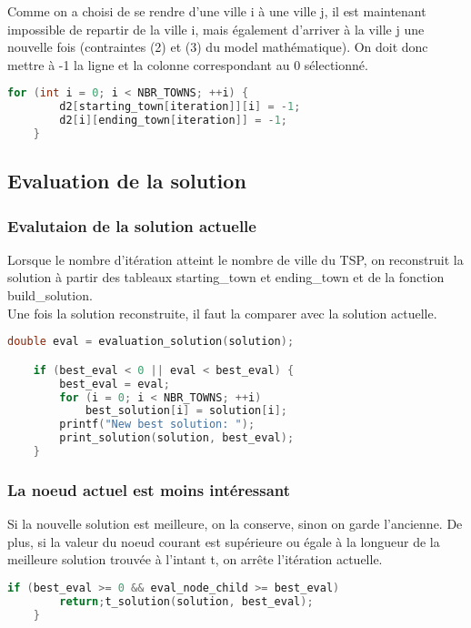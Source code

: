 \documentclass[a4paper]{article}
\begin{document}
Comme on a choisi de se rendre d'une ville i à une ville j, il est maintenant impossible de repartir de la ville i, mais également d'arriver à la ville j une nouvelle fois (contraintes (2) et (3) du model mathématique). On doit donc mettre à -1 la ligne et la colonne correspondant au 0 sélectionné.

\begin{lstlisting}[language=C]
    for (int i = 0; i < NBR_TOWNS; ++i) {
        d2[starting_town[iteration]][i] = -1;
        d2[i][ending_town[iteration]] = -1;
    }
\end{lstlisting}

\subsection{Evaluation de la solution}

\subsubsection{Evalutaion de la solution actuelle}

Lorsque le nombre d'itération atteint le nombre de ville du TSP, on reconstruit la solution à partir des tableaux starting\_town et ending\_town et de la fonction build\_solution.\\

Une fois la solution reconstruite, il faut la comparer avec la solution actuelle.

\begin{lstlisting}[language=C]
    double eval = evaluation_solution(solution);

    if (best_eval < 0 || eval < best_eval) {
        best_eval = eval;
        for (i = 0; i < NBR_TOWNS; ++i)
            best_solution[i] = solution[i];
        printf("New best solution: ");
        print_solution(solution, best_eval);
    }
\end{lstlisting}

\subsubsection{La noeud actuel est moins intéressant}

Si la nouvelle solution est meilleure, on la conserve, sinon on garde l'ancienne. De plus, si la valeur du noeud courant est supérieure ou égale à la longueur de la meilleure solution trouvée à l'intant t, on arrête l'itération actuelle.

\begin{lstlisting}[language=C]
    if (best_eval >= 0 && eval_node_child >= best_eval)
        return;t_solution(solution, best_eval);
    }
\end{lstlisting}
    
\end{document}

